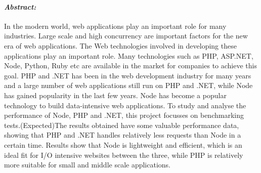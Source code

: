 \documentclass[../thesis.tex]{subfiles}
\begin{document}

\paragraph{\textit{Abstract:}}

In the modern world, web applications play an important role for many industries. Large scale and high concurrency are important factors for the new era of web applications. The Web technologies involved in developing these applications play an important role. Many technologies such as PHP, ASP.NET, Node, Python, Ruby etc are available in the market for companies to achieve this goal. PHP and .NET has been in the web development industry for many years and a large number of web applications still run on PHP and .NET, while Node has gained popularity in the last few years. Node has become a popular technology to build data-intensive web applications. To study and analyse the performance of Node, PHP and .NET, this project focusses on benchmarking tests.(Expected)The results obtained have some valuable performance data, showing that PHP and .NET handles relatively less requests than Node in a certain time. Results show that Node is lightweight and efficient, which is an ideal fit for I/O intensive websites between the three, while PHP is relatively more suitable for small and middle scale applications.
\end{document}
